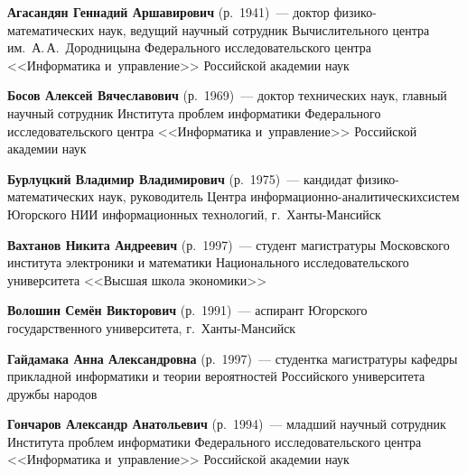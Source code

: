 \begin{multicols}{2}

\noindent
\textbf{Агасандян Геннадий Аршавирович} (р.\ 1941)~--- 
доктор фи\-зи\-ко-ма\-те\-ма\-ти\-че\-ских наук, ведущий научный со\-труд\-ник 
Вычислительного центра им.\ А.\,А.~Дородницына Федерального исследовательского 
цент\-ра <<Информатика и~управ\-ле\-ние>> Российской академии наук

\vspace*{3pt}

\noindent
\textbf{Босов Алексей Вячеславович} (р.\ 1969)~--- 
доктор технических наук, главный научный со\-труд\-ник Института проб\-лем 
информатики Федерального исследовательского центра <<Информатика и~управ\-ле\-ние>>
Российской академии наук

\vspace*{3pt}

\noindent
\textbf{Бурлуцкий Владимир Владимирович} (р.\ 1975)~--- 
кандидат фи\-зи\-ко-ма\-те\-ма\-ти\-че\-ских наук, руководитель Центра 
ин\-фор\-ма\-ци\-он\-но-ана\-ли\-ти\-че\-ских\linebreak сис\-тем Югорского НИИ 
информационных технологий, г.~Хан\-ты-Ман\-сийск

\vspace*{3pt}

\noindent
\textbf{Вахтанов Никита Андреевич} (р.\ 1997)~---  студент магистратуры  
Московского института электроники и математики 
Национального исследовательского университета <<Высшая школа экономики>>

\vspace*{3pt}

\noindent
\textbf{Волошин Семён Викторович} (р.\ 1991)~--- 
аспирант Югорского государственного университета, г.~Хан\-ты-Ман\-сийск

\vspace*{3pt}

\noindent
\textbf{Гайдамака Анна Александровна} (р.\ 1997)~--- 
студентка магистратуры кафедры прикладной информатики и теории вероятностей 
Российского университета дружбы народов

\vspace*{3pt}

\noindent
\textbf{Гончаров Александр Анатольевич} (р.\ 1994)~--- 
младший научный сотрудник Института проб\-лем\linebreak
 информатики Федерального 
ис\-сле\-дова\-тель\-ско\-го цент\-ра <<Информатика и~управ\-ле\-ние>> Российской академии наук


\end{multicols}
